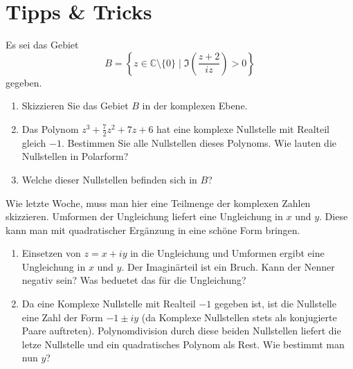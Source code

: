 \documentclass[12pt]{article}
\newcommand{\C}{\mathbb{C}}
\newenvironment{problem}[2][\textcolor{blue}{Tipps \& Tricks zu}]{\begin{trivlist}
        \item[\hskip \labelsep {\bfseries #1}\hskip \labelsep {\bfseries \textcolor{blue}{#2}.}]}{\end{trivlist}}
\newenvironment{question}[2][\textcolor{red}{Aufgabe}]{\begin{trivlist}
        \item[\hskip \labelsep {\bfseries \textcolor{red}{#1}}\hskip \labelsep {\bfseries \textcolor{red}{#2}.}]}{\end{trivlist}}
\begin{document}
\section{Tipps \& Tricks}

\begin{question}{1}
        Es sei das Gebiet
        \begin{equation}
                B=\left\{z\in\C\setminus\{0\}\mid\Im\left(\frac{z+2}{iz}\right)>0\right\}
        \end{equation}
        gegeben.
        \begin{enumerate}[label=(\alph*)]
                \item Skizzieren Sie das Gebiet $B$ in der komplexen Ebene.
                \item Das Polynom $z^3+\frac{7}{2}z^2+7z+6$ hat eine komplexe Nullstelle mit Realteil
                      gleich $-1$. Bestimmen Sie alle Nullstellen dieses Polynoms. Wie lauten die
                      Nullstellen in Polarform?
                \item Welche dieser Nullstellen befinden sich in $B$?
        \end{enumerate}
\end{question}

\begin{problem}{1} Wie letzte Woche, muss man hier eine Teilmenge der komplexen Zahlen skizzieren. Umformen der Ungleichung liefert eine Ungleichung in $x$ und $y$. Diese kann man mit quadratischer Ergänzung in eine schöne Form
        bringen.
\begin{enumerate}[label=(\alph*)]
        \item Einsetzen von $z=x+iy$ in die Ungleichung und Umformen ergibt eine Ungleichung in $x$ und $y$. Der Imaginärteil ist ein Bruch. Kann der Nenner negativ sein? Was beduetet das für die Ungleichung?
        \item Da eine Komplexe Nullstelle mit Realteil $-1$ gegeben ist, ist die Nullstelle eine Zahl der Form $-1\pm{iy}$ (da Komplexe Nullstellen stets als konjugierte Paare auftreten). Polynomdivision durch diese beiden Nullstellen liefert die letze Nullstelle und ein quadratisches Polynom als Rest. Wie bestimmt man nun $y$?
\end{enumerate}
\end{problem}
\end{document}
